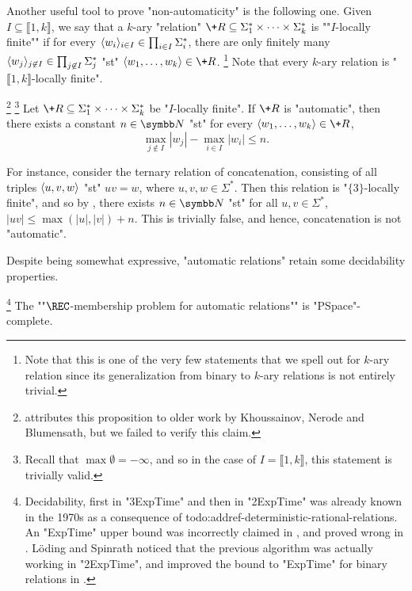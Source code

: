 Another useful tool to prove "non-automaticity" is the following one.
Given $I \subseteq \lBrack 1,k\rBrack$,
we say that a $k$-ary "relation" $\+R \subseteq \Sigma_1^* \times \cdots \times \Sigma_k^*$ is
""$I$-locally finite"" if for every $\langle w_i\rangle_{i\in I} \in \prod_{i\in I} \Sigma_i^*$,
there are only finitely many $\langle w_j\rangle_{j\not\in I} \in \prod_{j \not\in I} \Sigma_j^*$
"st" $\tup{w_1,\hdots,w_k} \in \+R$.%
\footnote{Note that this is one of the very few statements
that we spell out for $k$-ary relation since its generalization from binary to $k$-ary relations
is not entirely trivial.}
Note that every $k$-ary relation is "$\lBrack 1,k\rBrack$-locally finite".
\begin{proposition}
	\!\footnote{\cite{KhoussainovNiesRubinStephan2007Automatic} attributes this proposition
	to older work by Khoussainov, Nerode and Blumensath, but we failed to verify this claim.}%
	\footnote{Recall that $\max{\emptyset} = -\infty$, and so in the case
	of $I = \lBrack 1,k\rBrack$, this statement is trivially valid.}
	\AP\label{prop:bound-automatic-structures}
	Let $\+R \subseteq \Sigma_1^* \times \cdots \times \Sigma_k^*$ be "$I$-locally finite".
	If $\+R$ is "automatic", then there exists a constant $n\in\N$ "st" for every
	$\tup{w_1,\hdots,w_k} \in \+R$,
	\[
		\max_{j \not\in I}{|w_j|} - \max_{i \in I}{|w_i|} \leq n.
	\]
\end{proposition}

For instance, consider the ternary relation of concatenation,
consisting of all triples $\langle u,v,w\rangle$ "st" $uv = w$, where $u,v,w\in\Sigma^*$.
Then this relation is "$\{3\}$-locally finite", and so by
, there exists $n\in \N$
"st" for all $u,v \in \Sigma^*$, $|uv| \leq \max{(|u|,|v|)} + n$.
This is trivially false, and hence, concatenation is not "automatic".

Despite being somewhat expressive, "automatic relations" retain some decidability properties. 
\begin{proposition}
	\!\footnote{Decidability, first in "3ExpTime" and then
	in "2ExpTime" was already known in the 1970s as a consequence
	of todo:addref-deterministic-rational-relations.
	An "ExpTime" upper bound was incorrectly claimed in \cite[Table~1]{CartonChoffrutGrigorieff2006DecisionProblems},
	and proved wrong in \cite[\S~4.1]{LodingSpinrath2019DecisionProblems}.
	Löding and Spinrath noticed that the previous algorithm was
	actually working in "2ExpTime", and improved 
	the bound to "ExpTime" for binary relations
	in \cite[Corollary~22]{LodingSpinrath2019DecisionProblems}.}
	The ""$\REC$-membership problem for automatic relations"" is "PSpace"-complete.
\end{proposition}

